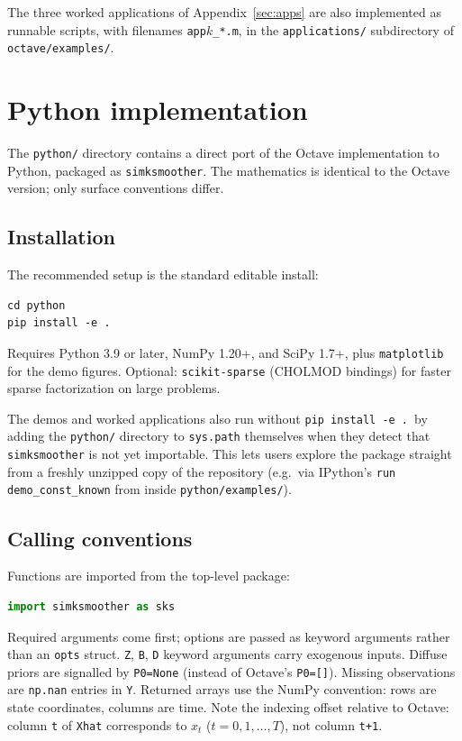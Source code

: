 \documentclass[11pt]{article}
\begin{document}
The three worked applications of Appendix~\ref{sec:apps} are also
implemented as runnable scripts, with filenames \texttt{app$k$\_*.m},
in the \texttt{applications/} subdirectory of
\texttt{octave/examples/}.

\section{Python implementation}
\label{sec:python-impl}

The \texttt{python/} directory contains a direct port of the Octave
implementation to Python, packaged as \texttt{simksmoother}.  The
mathematics is identical to the Octave version; only surface
conventions differ.

\subsection{Installation}

The recommended setup is the standard editable install:
\begin{lstlisting}
cd python
pip install -e .
\end{lstlisting}
Requires Python 3.9 or later, NumPy 1.20+, and SciPy 1.7+, plus
\texttt{matplotlib} for the demo figures.  Optional:
\texttt{scikit-sparse} (CHOLMOD bindings) for faster sparse
factorization on large problems.

The demos and worked applications also run without
\texttt{pip install -e .}\ by adding the \texttt{python/} directory
to \texttt{sys.path} themselves when they detect that
\texttt{simksmoother} is not yet importable.  This lets users explore
the package straight from a freshly unzipped copy of the repository
(e.g.\ via IPython's \texttt{run demo\_const\_known} from inside
\texttt{python/examples/}).

\subsection{Calling conventions}

Functions are imported from the top-level package:
\begin{lstlisting}[language=Python]
import simksmoother as sks
\end{lstlisting}
Required arguments come first; options are passed as keyword
arguments rather than an \texttt{opts} struct.  \texttt{Z},
\texttt{B}, \texttt{D} keyword arguments carry exogenous inputs.
Diffuse priors are signalled by \texttt{P0=None} (instead of Octave's
\texttt{P0=[]}).  Missing observations are \texttt{np.nan} entries in
\texttt{Y}.  Returned arrays use the NumPy convention: rows are
state coordinates, columns are time.  Note the indexing offset
relative to Octave: column \texttt{t} of \texttt{Xhat} corresponds
to $x_t$ ($t = 0,1,\ldots,T$), not column \texttt{t+1}.
\end{document}

